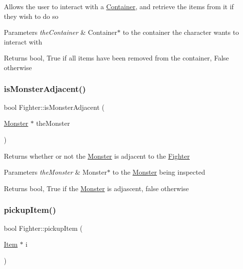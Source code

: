 Allows the user to interact with a \hyperlink{class_container}{Container}, and retrieve the items from it if they wish to do so 
\begin{DoxyParams}{Parameters}
{\em the\+Container} & Container$\ast$ to the container the character wants to interact with \\
\hline
\end{DoxyParams}
\begin{DoxyReturn}{Returns}
bool, True if all items have been removed from the container, False otherwise 
\end{DoxyReturn}
\hypertarget{class_fighter_a4d5e0c68989f19bc3cd922c0fb46c718}{}\label{class_fighter_a4d5e0c68989f19bc3cd922c0fb46c718} 
\subsubsection{\texorpdfstring{is\+Monster\+Adjacent()}{isMonsterAdjacent()}}
{\footnotesize\ttfamily bool Fighter\+::is\+Monster\+Adjacent (\begin{DoxyParamCaption}\item[{\hyperlink{class_monster}{Monster} $\ast$}]{the\+Monster }\end{DoxyParamCaption})\hspace{0.3cm}{\ttfamily [protected]}}

Returns whether or not the \hyperlink{class_monster}{Monster} is adjacent to the \hyperlink{class_fighter}{Fighter} 
\begin{DoxyParams}{Parameters}
{\em the\+Monster} & Monster$\ast$ to the \hyperlink{class_monster}{Monster} being inspected \\
\hline
\end{DoxyParams}
\begin{DoxyReturn}{Returns}
bool, True if the \hyperlink{class_monster}{Monster} is adjascent, false otherwise 
\end{DoxyReturn}
\hypertarget{class_fighter_a69dccfbc61abf5720e8a329203158d1e}{}\label{class_fighter_a69dccfbc61abf5720e8a329203158d1e} 
\subsubsection{\texorpdfstring{pickup\+Item()}{pickupItem()}}
{\footnotesize\ttfamily bool Fighter\+::pickup\+Item (\begin{DoxyParamCaption}\item[{\hyperlink{class_item}{Item} $\ast$}]{i }\end{DoxyParamCaption})}

